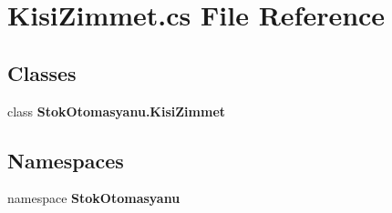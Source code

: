 \section{Kisi\+Zimmet.\+cs File Reference}
\label{_kisi_zimmet_8cs}
\subsection*{Classes}
\begin{DoxyCompactItemize}
\item 
class \textbf{ Stok\+Otomasyanu.\+Kisi\+Zimmet}
\end{DoxyCompactItemize}
\subsection*{Namespaces}
\begin{DoxyCompactItemize}
\item 
namespace \textbf{ Stok\+Otomasyanu}
\end{DoxyCompactItemize}
